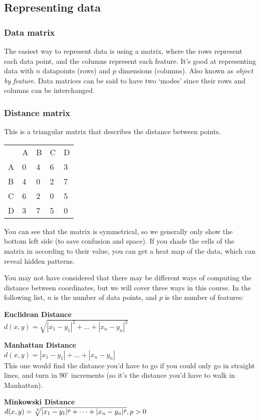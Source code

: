 \subsection{Representing data}

\subsubsection{Data matrix}

The easiest way to represent data is using a matrix, where the rows represent
each data point, and the columns represent each feature. It's good at
representing data with $n$ datapoints (rows) and $p$ dimensions (columns). Also
known as \textit{object by feature}. Data matrices can be said to have two
`modes' since their rows and columns can be interchanged.

\subsubsection{Distance matrix}

This is a triangular matrix that describes the distance between points.

\begin{center}
  \begin{tabular}{lllll}
      & A & B & C & D\\
    A & 0 & 4 & 6 & 3\\
    B & 4 & 0 & 2 & 7\\
    C & 6 & 2 & 0 & 5\\
    D & 3 & 7 & 5 & 0
  \end{tabular}
\end{center}

You can see that the matrix is symmetrical, so we generally only show the bottom
left side (to save confusion and space). If you shade the cells of the matrix in
according to their value, you can get a heat map of the data, which can reveal
hidden patterns.

You may not have considered that there may be different ways of computing the
distance between coordinates, but we will cover three ways in this course. In
the following list, $n$ is the number of data points, and $p$ is the number of
features:

\begin{description}
  \item \textbf{Euclidean Distance}\\ 
    $d(x,y) = \sqrt{|x_1 - y_1|^2 + \dots + |x_n - y_n|^2}$
  \item \textbf{Manhattan Distance}\\
    $d(x,y) = |x_1 - y_1| + \dots + |x_n - y_n|$\\
    This one would find the distance you'd have to go if you could only go in
    straight lines, and turn in $90^{\circ}$ increments (so it's the distance
    you'd have to walk in Manhattan).
  \item \textbf{Minkowski Distance}\\
    $d(x,y) = \sqrt[\leftroot{-2}\uproot{2}p]{|x_1 - y_1|^p + \dots + |x_n - y_n|^p}, p > 0$
\end{description}

